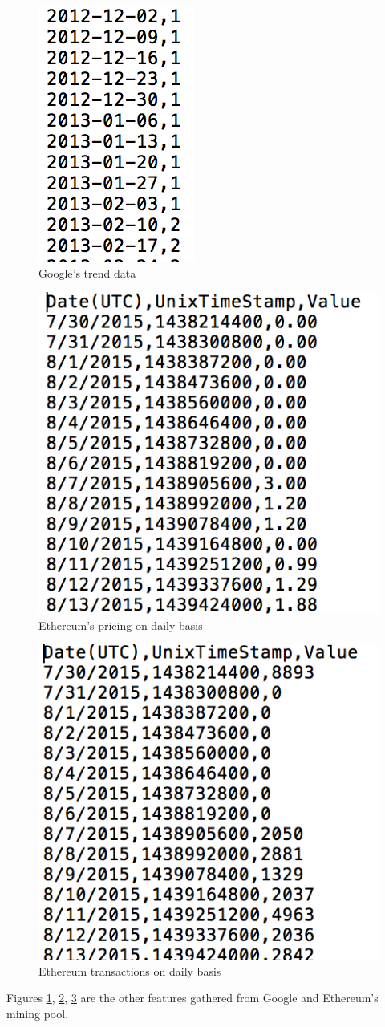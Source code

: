 \documentclass[sigconf]{acmart}
\begin{document}
\begin{figure}[!ht]
  \centering\includegraphics[width=0.18\columnwidth]{images/googledata.png}
  \caption{Google's trend data}
  \label{fig:googledata}
\end{figure}

\begin{figure}[!ht]
  \centering\includegraphics[width=0.4\columnwidth]{images/ethprice.png}
  \caption{Ethereum's pricing on daily basis}
  \label{fig:ethpri}
\end{figure}

\begin{figure}[!ht]
  \centering\includegraphics[width=0.4\columnwidth]{images/ethtran.png}
  \caption{Ethereum transactions on daily basis}
  \label{fig:ethtran}
\end{figure}

Figures \ref{fig:googledata}, \ref{fig:ethpri}, \ref{fig:ethtran} are the other features gathered from Google and Ethereum's mining pool. 
\end{document}
